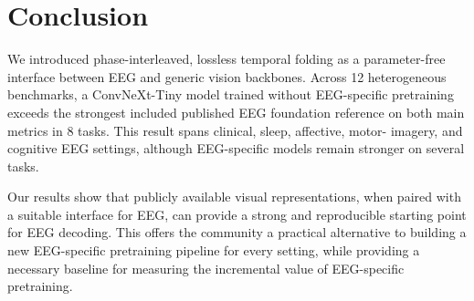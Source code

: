 \section{Conclusion}

We introduced phase-interleaved, lossless temporal folding as a parameter-free
interface between EEG and generic vision backbones. Across 12 heterogeneous
benchmarks, a ConvNeXt-Tiny model trained without EEG-specific pretraining
exceeds the strongest included published EEG foundation reference on both main
metrics in 8 tasks. This result spans clinical, sleep, affective, motor-
imagery, and cognitive EEG settings, although EEG-specific models remain
stronger on several tasks.

Our results show that publicly available visual representations, when paired
with a suitable interface for EEG, can provide a strong and reproducible
starting point for EEG decoding. This offers the community a practical
alternative to building a new EEG-specific pretraining pipeline for every
setting, while providing a necessary baseline for measuring the incremental
value of EEG-specific pretraining.
